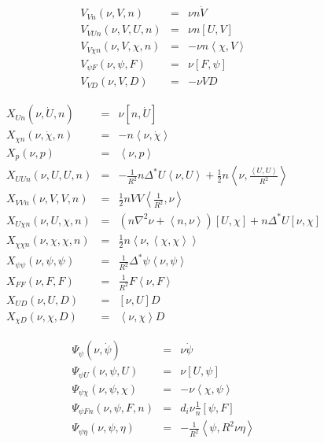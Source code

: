 \documentclass[letterpaper]{book}
\newcommand{\gs}[1]{\Delta^* #1}
\newcommand{\lp}[1]{\nabla^2 #1}
\newcommand{\pb}[2]{\left[#1,#2\right]}
\newcommand{\ip}[2]{\left\langle  #1,#2\right\rangle}
\begin{document}
\begin{equation}
  \begin{array}{lcl}
    V_{V n}(\nu, V, n) & = & \nu n \dot{V}\\
    V_{V U n}(\nu, V, U, n) & = & \nu n \pb{U}{V}\\
    V_{V \chi n}(\nu, V, \chi, n) & = & -\nu n \ip{\chi}{V}\\
    V_{\psi F}(\nu, \psi, F) & = & \nu \pb{F}{\psi}\\
    V_{V D}(\nu, V, D) & = & -\nu V D
  \end{array}
\end{equation}    

\begin{equation}
  \begin{array}{lcl}
    X_{U n}(\nu, \dot U, n) & = & \nu \pb{n}{\dot{U}}
    \\
    X_{\chi n}(\nu, \dot \chi, n) & = & -n \ip{\nu}{\dot{\chi}}
    \\
    X_p(\nu, p) & = & \ip{\nu}{p}
    \\
    X_{U U n}(\nu, U, U, n) & = & -\frac{1}{R^2} n \gs{U} \ip{\nu}{U}
      + \frac{1}{2} n \ip{\nu}{\frac{\ip{U}{U}}{R^2}}
    \\
    X_{V V n}(\nu, V,  V, n) & = & 
      \frac{1}{2} n V V \ip{\frac{1}{R^2}}{\nu}
    \\
    X_{U \chi n}(\nu, U, \chi, n) & = & 
      \left( n \lp{\nu} + \ip{n}{\nu} \right) \pb{U}{\chi}
      + n \gs{U} \pb{\nu}{\chi}
    \\
    X_{\chi \chi n}(\nu, \chi, \chi, n) & = & \frac{1}{2} n 
      \ip{\nu}{\ip{\chi}{\chi}}
    \\
    X_{\psi \psi}(\nu, \psi, \psi) & = & 
      \frac{1}{R^2} \gs{\psi} \ip{\nu}{\psi}
    \\
    X_{F F}(\nu, F, F) & = & \frac{1}{R^2} F \ip{\nu}{F}
    \\
    X_{U D}(\nu, U, D) & = & \pb{\nu}{U} D
    \\
    X_{\chi D}(\nu, \chi, D) & = & \ip{\nu}{\chi} D
  \end{array}
\end{equation}


\begin{equation}
  \begin{array}{lcl}
    \Psi_{\psi}(\nu, \dot{\psi}) & = & \nu \dot{\psi}\\
    \Psi_{\psi U}(\nu, \psi, U) & = & \nu \pb{U}{\psi}\\
    \Psi_{\psi \chi}(\nu, \psi, \chi) & = & -\nu \ip{\chi}{\psi}\\
    \Psi_{\psi F n}(\nu, \psi, F, n) & = & d_i \nu \frac{1}{n} \pb{\psi}{F}\\
    \Psi_{\psi \eta}(\nu, \psi, \eta) & = & 
        -\frac{1}{R^2} \ip{\psi}{R^2 \nu \eta} 
  \end{array}
\end{equation}
\end{document}

